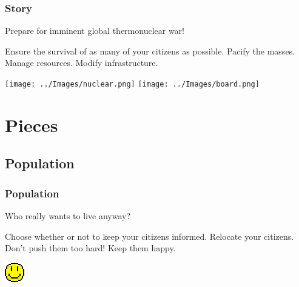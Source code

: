 \documentclass[aspectratio=169]{beamer}
\begin{document}
\begin{frame}

  \frametitle{Story}

  \begin{center}
    {\Large Prepare for imminent global thermonuclear war!}
  \end{center}

  \begin{outline}
    \1 Ensure the survival of as many of your citizens as possible.
    \1 Pacify the masses.
    \1 Manage resources.
    \1 Modify infrastructure.
  \end{outline}

  \begin{center}
    \texttt{[image: ../Images/nuclear.png]}
    \texttt{[image: ../Images/board.png]}
  \end{center}

\end{frame}


\section{Pieces}

\subsection{Population}


\begin{frame}

  \frametitle{Population}

  \begin{center}
    {\large Who really wants to live anyway?}
  \end{center}

  \begin{outline}
    \1 Choose whether or not to keep your citizens informed.
    \1 Relocate your citizens.
    \1 Don't push them too hard!
    \1 Keep them happy.
  \end{outline}

  \begin{center}
    \includegraphics[scale=2.0]{../reset/images/happiness.png}
  \end{center}

\end{frame}
\end{document}

